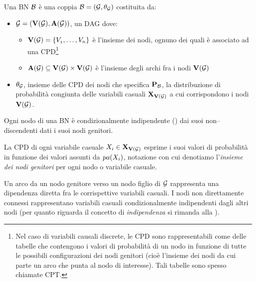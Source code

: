\begin{definizione}[\acl{BN}]
\label{defn:bn}
Una \acl{BN} $\mathcal{B}$ è una coppia $\mathcal{B}=(\mathcal{G},\theta_{\mathcal{G}})$ costituita da:
\begin{itemize}
    \item $\mathcal{G}=(\mathbf{V}(\mathcal{G}),\mathbf{A}(\mathcal{G}))$, un \acl{DAG} dove:
    \begin{itemize}
        \item $\mathbf{V}(\mathcal{G})=\{\mathnormal{V_1}, \dotsc, \mathnormal{V_n}\}$ è l'insieme dei nodi, ognuno dei quali è associato ad una \acf{CPD}\footnote{Nel caso di variabili causali discrete, le \acs{CPD} sono rappresentabili come delle tabelle che contengono i valori di probabilità di un nodo in funzione di tutte le possibili configurazioni dei nodi genitori (cioè l'insieme dei nodi da cui parte un arco che punta al nodo di interesse). Tali tabelle sono spesso chiamate \acf{CPT}.}
        \item $\mathbf{A}(\mathcal{G})\subseteq\mathbf{V}(\mathcal{G})\times\mathbf{V}(\mathcal{G})$ è l'insieme degli archi fra i nodi $\mathbf{V}(\mathcal{G})$
    \end{itemize}
    \item $\theta_{\mathcal{G}}$, insieme delle \acs{CPD} dei nodi che specifica $\mathbf{P}_{\mathcal{B}}$, la distribuzione di probabilità congiunta delle variabili casuali $\mathbf{X}_{\mathbf{V}(\mathcal{G})}$ a cui corrispondono i nodi $\mathbf{V}(\mathcal{G})$.
\end{itemize}
\end{definizione}
\begin{osservazione}\label{oss:bn-markov-assumption}
Ogni nodo di una \acs{BN} è condizionalmente indipendente () dai suoi non--discendenti dati i suoi nodi genitori.
\end{osservazione}

La \acs{CPD} di ogni variabile casuale $\mathnormal{X_i}\in\mathbf{X}_{\mathbf{V}(\mathcal{G})}$ esprime i suoi valori di probabilità in funzione dei valori assunti da $pa(\mathnormal{X_i})$, notazione con cui denotiamo l'\emph{insieme dei nodi genitori} per ogni nodo o variabile casuale.

Un arco da un nodo genitore verso un nodo figlio di $\mathcal{G}$ rappresenta una dipendenza diretta fra le corrispettive variabili casuali. I nodi non direttamente connessi rappresentano variabili casuali condizionalmente indipendenti dagli altri nodi (per quanto riguarda il concetto di \emph{indipendenza \cond*{}} si rimanda alla ).

